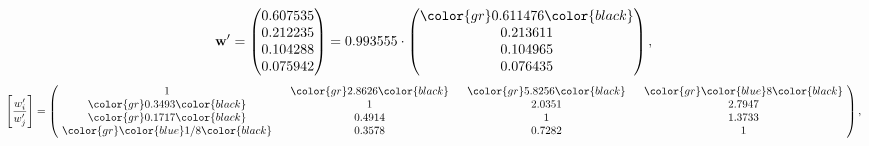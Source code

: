 \begin{example}
\begin{equation*}
\mathbf{w}^{\prime} =
\begin{pmatrix}
0.607535\\
0.212235\\
0.104288\\
0.075942
\end{pmatrix} =
0.993555\cdot
\begin{pmatrix}
\color{gr} 0.611476\color{black} \\
0.213611\\
0.104965\\
0.076435
\end{pmatrix},
\end{equation*}
\begin{equation*}
\left[ \frac{{w}^{\prime}_i}{{w}^{\prime}_j} \right] =
\begin{pmatrix}
$\,\,$ 1 $\,\,$ & $\,\,$\color{gr} 2.8626\color{black} $\,\,$ & $\,\,$\color{gr} 5.8256\color{black} $\,\,$ & $\,\,$\color{gr} \color{blue} 8\color{black} $\,\,$ \\
$\,\,$\color{gr} 0.3493\color{black} $\,\,$ & $\,\,$ 1 $\,\,$ & $\,\,$2.0351$\,\,$ & $\,\,$2.7947  $\,\,$ \\
$\,\,$\color{gr} 0.1717\color{black} $\,\,$ & $\,\,$0.4914$\,\,$ & $\,\,$ 1 $\,\,$ & $\,\,$1.3733 $\,\,$ \\
$\,\,$\color{gr} \color{blue}  1/8\color{black} $\,\,$ & $\,\,$0.3578$\,\,$ & $\,\,$0.7282$\,\,$ & $\,\,$ 1  $\,\,$ \\
\end{pmatrix},
\end{equation*}
\end{example}
\newpage
